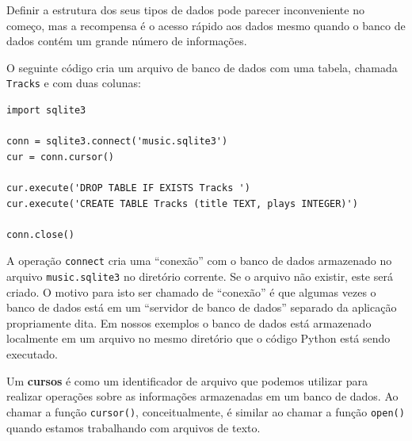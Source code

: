 Definir a estrutura dos seus tipos de dados pode parecer inconveniente no
começo, mas a recompensa é o acesso rápido aos dados mesmo quando o banco
de dados contém um grande número de informações.


O seguinte código cria um arquivo de banco de dados com uma tabela, chamada
{\tt Tracks} e com duas colunas:

\beforeverb
\begin{verbatim}
import sqlite3

conn = sqlite3.connect('music.sqlite3')
cur = conn.cursor()

cur.execute('DROP TABLE IF EXISTS Tracks ')
cur.execute('CREATE TABLE Tracks (title TEXT, plays INTEGER)')

conn.close()
\end{verbatim}
\afterverb
%

A operação {\tt connect} cria uma ``conexão'' com o banco de dados armazenado
no arquivo {\tt music.sqlite3} no diretório corrente. Se o arquivo não
existir, este será criado. O motivo para isto ser chamado de ``conexão'' é
que algumas vezes o banco de dados está  em um ``servidor de banco de dados'' 
separado da aplicação propriamente dita. Em nossos exemplos o banco de dados
está armazenado localmente em um arquivo no mesmo diretório que o código
Python está sendo executado.



Um {\bf cursos} é como um identificador de arquivo que podemos utilizar para
realizar operações sobre as informações armazenadas em um banco de dados. Ao
chamar a função {\tt cursor()}, conceitualmente, é similar ao chamar a função
{\tt open()} quando estamos trabalhando com arquivos de texto.


